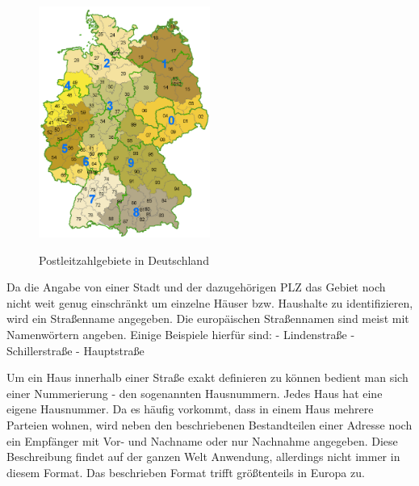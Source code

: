 \begin{figure}
  \centering
    \includegraphics[width=0.50\textwidth]{ref/images/plzgebiete.png}
   \caption{Postleitzahlgebiete in Deutschland}
  \label{fig:Postleitzahlgebiete}
   \cite{PLZGebite}
\end{figure}



Da die Angabe von einer Stadt und der dazugehörigen PLZ das Gebiet noch nicht weit genug einschränkt um einzelne Häuser bzw. Haushalte zu identifizieren, wird ein Straßenname angegeben.
Die europäischen Straßennamen sind meist mit Namenwörtern angeben.
Einige Beispiele hierfür sind:
-	Lindenstraße
-	Schillerstraße
-	Hauptstraße

Um ein Haus innerhalb einer Straße exakt definieren zu können bedient man sich einer Nummerierung - den sogenannten Hausnummern. Jedes Haus hat eine eigene Hausnummer. 
Da es häufig vorkommt, dass in einem Haus mehrere Parteien wohnen, wird neben den beschriebenen Bestandteilen einer Adresse noch ein Empfänger mit Vor- und Nachname oder nur Nachnahme angegeben.
Diese Beschreibung findet auf der ganzen Welt Anwendung, allerdings nicht immer in diesem Format. Das beschrieben Format trifft größtenteils in Europa zu. 

